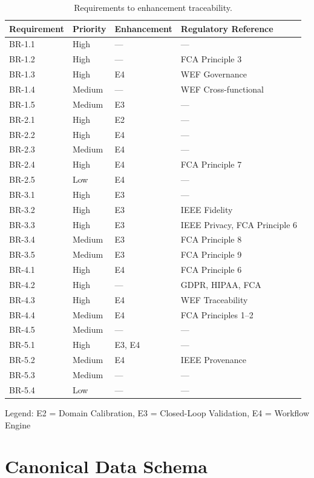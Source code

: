 \documentclass[12pt,a4paper,twoside]{report}
\begin{document}
\begin{table}[htbp]
\centering
\caption{Requirements to enhancement traceability.}
\label{tab:req-traceability}
\scriptsize
\begin{tabularx}{\textwidth}{@{}l l l X@{}}
\toprule
\textbf{Requirement} & \textbf{Priority} & \textbf{Enhancement} & \textbf{Regulatory Reference} \\
\midrule
BR-1.1 & High & --- & --- \\
BR-1.2 & High & --- & FCA Principle 3 \\
BR-1.3 & High & E4 & WEF Governance \\
BR-1.4 & Medium & --- & WEF Cross-functional \\
BR-1.5 & Medium & E3 & --- \\
\midrule
BR-2.1 & High & E2 & --- \\
BR-2.2 & High & E4 & --- \\
BR-2.3 & Medium & E4 & --- \\
BR-2.4 & High & E4 & FCA Principle 7 \\
BR-2.5 & Low & E4 & --- \\
\midrule
BR-3.1 & High & E3 & --- \\
BR-3.2 & High & E3 & IEEE Fidelity \\
BR-3.3 & High & E3 & IEEE Privacy, FCA Principle 6 \\
BR-3.4 & Medium & E3 & FCA Principle 8 \\
BR-3.5 & Medium & E3 & FCA Principle 9 \\
\midrule
BR-4.1 & High & E4 & FCA Principle 6 \\
BR-4.2 & High & --- & GDPR, HIPAA, FCA \\
BR-4.3 & High & E4 & WEF Traceability \\
BR-4.4 & Medium & E4 & FCA Principles 1--2 \\
BR-4.5 & Medium & --- & --- \\
\midrule
BR-5.1 & High & E3, E4 & --- \\
BR-5.2 & Medium & E4 & IEEE Provenance \\
BR-5.3 & Medium & --- & --- \\
BR-5.4 & Low & --- & --- \\
\bottomrule
\end{tabularx}
\end{table}

Legend: E2 = Domain Calibration, E3 = Closed-Loop Validation, E4 = Workflow Engine
\chapter{Canonical Data Schema}
\label{chap:schema}
\end{document}
